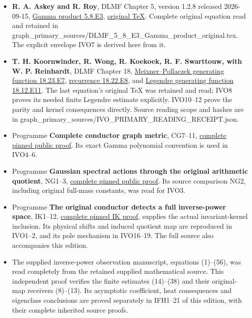 \documentclass[11pt]{article}
\begin{document}
\begin{itemize}
\tightlist
\item
  \textbf{R. A. Askey and R. Roy}, DLMF Chapter 5, version 1.2.8 released 2026-09-15, \href{https://dlmf.nist.gov/5.8.E3}{Gamma product 5.8.E3}, \href{https://dlmf.nist.gov/5.8.E3.tex}{original TeX}. Complete original equation read and retained in graph\_primary\_sources/DLMF\_5\_8\_E3\_Gamma\_product\_original.tex. The explicit envelope IVO7 is derived here from it.
\item
  \textbf{T. H. Koornwinder, R. Wong, R. Koekoek, R. F. Swarttouw, with W. P. Reinhardt}, DLMF Chapter 18, \href{https://dlmf.nist.gov/18.23.E7}{Meixner--Pollaczek generating function 18.23.E7}, \href{https://dlmf.nist.gov/18.22.E8}{recurrence 18.22.E8}, and \href{https://dlmf.nist.gov/18.12.E11}{Legendre generating function 18.12.E11}. The last equation's original TeX was retained and read; IVO8 proves its needed finite Legendre estimate explicitly. IVO10--12 prove the parity and kernel consequences directly. Source reading scope and hashes are in graph\_primary\_sources/IVO\_PRIMARY\_READING\_RECEIPT.json.
\item
  Programme \textbf{Complete conductor graph metric}, CG7--11, \href{https://github.com/KokunoYumeto/zeta-function-research-reader/blob/0fd693c844aad9117e30ec447c59864a28af10f3/workbenches/splitzero-tandem/continuations/20260921-native-spectral-real-pair/003/COMPLETE_CONDUCTOR_GRAPH_METRIC.tex}{complete pinned public proof}. Its exact Gamma polynomial convention is used in IVO4--6.
\item
  Programme \textbf{Gaussian spectral actions through the original arithmetic quotient}, NG1--3, \href{https://github.com/KokunoYumeto/zeta-function-research-reader/blob/5992ad50c0f2a06921f1fcaded7b4e38097c0739/workbenches/splitzero-tandem/continuations/20260920-original-kernel-mixed-determinants/providers/NATIVE_GAUSSIAN_TRANSFER.tex\#L32}{complete pinned public proof}. Its source comparison NG2, including original full-mass constants, was read for IVO3.
\item
  Programme \textbf{The original conductor detects a full inverse-power space}, IK1--12, \href{https://github.com/KokunoYumeto/zeta-function-research-reader/blob/689a8f87e9c12b7a99b01b3123438c6751ee608f/workbenches/splitzero-tandem/continuations/20260921-directional-inverse-power/007/INVERSE_POWER_CONDUCTOR_OBSERVABILITY.tex}{complete pinned IK proof}, supplies the actual invariant-kernel inclusion. Its physical shifts and induced quotient map are reproduced in IVO1--2, and its pole mechanism in IVO16--19. The full source also accompanies this edition.
\item
  The supplied inverse-power observation manuscript, equations (1)--(56), was read completely from the retained supplied mathematical source. This independent proof verifies the finite estimates (14)--(38) and their original-map receivers (8)--(13). Its asymptotic coefficient, heat consequences and eigenclass conclusions are proved separately in IFH1--21 of this edition, with their complete inherited source proofs.
\end{itemize}
\end{document}
